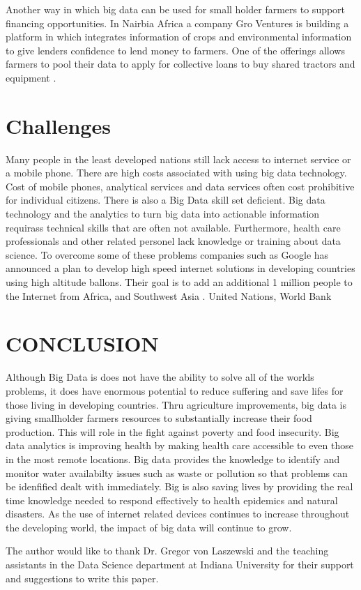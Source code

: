 \documentclass[sigconf]{acmart}
\begin{document}
Another way in which big data can be used for small holder farmers to support financing opportunities. In Nairbia Africa a company Gro Ventures is building a platform in which integrates information of crops and environmental information to give lenders confidence to lend money to farmers. One of the offerings allows farmers to pool their data to apply for collective loans to buy shared tractors and equipment \cite{www-google-Hffpst}.   

\section{Challenges}
Many people in the least developed nations still lack access to internet service or a mobile phone. There are high costs associated with using big data technology. Cost of mobile phones, analytical services and data services often cost prohibitive for individual citizens. There is also a Big Data skill set deficient. Big data technology and the analytics to turn big data into actionable information requirass technical skills that are often not available. Furthermore, health care professionals and other related personel lack knowledge or training about data science. 
To overcome some of these problems companies such as Google has announced a plan to develop high speed internet solutions in developing countries using high altitude ballons. Their goal is to add an additional 1 million people to the Internet from Africa,  and Southwest Asia \cite{DevEcon}. 
United Nations, World Bank	




 





\section{CONCLUSION}


Although Big Data is does not have the ability to solve all of the worlds problems, it does have enormous potential to reduce suffering and save lifes for those living in developing countries. Thru agriculture improvements, big data is giving smallholder farmers resources to substantially increase their food production. This will role in the fight against poverty and food insecurity. Big data analytics is improving health by making health care accessible to even those in the most remote locations. Big data provides the knowledge to identify and monitor water availabilty issues such as waste or pollution so that problems can be idenfified dealt with immediately. Big is also saving lives by providing the real time knowledge needed to respond effectively to health epidemics and natural disasters. As the use of internet related devices continues to increase throughout the developing world, the impact of big data will continue to grow.   







\begin{acks}

  The author would like to thank Dr. Gregor von Laszewski and the teaching assistants in the Data Science department at Indiana  University for their support and suggestions to write this paper.

\end{acks}




 
\end{document}

